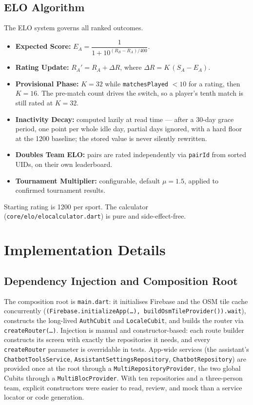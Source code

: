 \documentclass{configurations/polimi3i_thesis}
\renewcommand{\_}{\textunderscore\allowbreak}
\begin{document}
\section{ELO Algorithm}
\label{sec:elo_algorithm}

The ELO system governs all ranked outcomes.
\begin{itemize}
    \item \textbf{Expected Score:} $E_A = \dfrac{1}{1 + 10^{(R_B - R_A)/400}}$.
    \item \textbf{Rating Update:} $R_A' = R_A + \Delta R$, where $\Delta R = K\,(S_A - E_A)$.
    \item \textbf{Provisional Phase:} $K = 32$ while \texttt{matchesPlayed} $< 10$ for a rating, then $K = 16$. The pre-match count drives the switch, so a player's tenth match is still rated at $K=32$.
    \item \textbf{Inactivity Decay:} computed lazily at read time — after a 30-day grace period, one point per whole idle day, partial days ignored, with a hard floor at the 1200 baseline; the stored value is never silently rewritten.
    \item \textbf{Doubles Team ELO:} pairs are rated independently via \texttt{pairId} from sorted UIDs, on their own leaderboard.
    \item \textbf{Tournament Multiplier:} configurable, default $\mu = 1.5$, applied to confirmed tournament results.
\end{itemize}
Starting rating is 1200 per sport. The calculator (\texttt{core/elo/elo\_calculator.dart}) is pure and side-effect-free.


\chapter{Implementation Details}
\label{ch:implementation_details}

\section{Dependency Injection and Composition Root}
\label{sec:di}
The composition root is \texttt{main.dart}: it initialises Firebase and the OSM tile cache concurrently (\texttt{(Firebase.initializeApp(\dots), buildOsmTileProvider()).wait}), constructs the long-lived \texttt{AuthCubit} and \texttt{LocaleCubit}, and builds the router via \texttt{createRouter(\dots)}. Injection is manual and constructor-based: each route builder constructs its screen with exactly the repositories it needs, and every \texttt{createRouter} parameter is overridable in tests. App-wide services (the assistant's \texttt{ChatbotToolsService}, \texttt{AssistantSettingsRepository}, \texttt{ChatbotRepository}) are provided once at the root through a \texttt{MultiRepositoryProvider}, the two global Cubits through a \texttt{MultiBlocProvider}. With ten repositories and a three-person team, explicit constructors were easier to read, review, and mock than a service locator or code generation.
\end{document}
